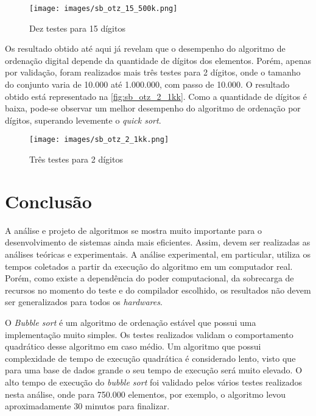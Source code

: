 \documentclass[12pt]{article}
\begin{document}
\begin{figure}[h]
	\centering
	\caption{Dez testes para 15 dígitos}
	\texttt{[image: images/sb\_otz\_15\_500k.png]}
	\label{fig:sb_otz_15_500k}
\end{figure}

Os resultado obtido até aqui já revelam que o desempenho do algoritmo de ordenação digital depende da quantidade de dígitos dos elementos. Porém, apenas por validação, foram realizados mais três testes para 2 dígitos, onde o tamanho do conjunto varia de 10.000 até 1.000.000, com passo de 10.000. O resultado obtido está representado na \autoref{fig:sb_otz_2_1kk}. Como a quantidade de dígitos é baixa, pode-se observar um melhor desempenho do algoritmo de ordenação por dígitos, superando levemente o \textit{quick sort}. 

\begin{figure}[h!]
	\centering
	\caption{Três testes para 2 dígitos}
	\texttt{[image: images/sb\_otz\_2\_1kk.png]}
	\label{fig:sb_otz_2_1kk}
\end{figure}

\section{Conclusão}

A análise e projeto de algoritmos se mostra muito importante para o desenvolvimento de sistemas ainda mais eficientes. Assim, devem ser realizadas as análises teóricas e experimentais. A análise experimental, em particular, utiliza os tempos coletados a partir da execução do algoritmo em um computador real. Porém, como existe a dependência do poder computacional, da sobrecarga de recursos no momento do teste e do compilador escolhido, os resultados não devem ser generalizados para todos os \textit{hardwares}.

O \textit{Bubble sort} é um algoritmo de ordenação estável que possui uma implementação muito simples. Os testes realizados validam o comportamento quadrático desse algoritmo em caso médio. Um algoritmo que possui complexidade de tempo de execução quadrática é considerado lento, visto que para uma base de dados grande o seu tempo de execução será muito elevado. O alto tempo de execução do \textit{bubble sort} foi validado pelos vários testes realizados nesta análise, onde para 750.000 elementos, por exemplo, o algoritmo levou aproximadamente 30 minutos para finalizar.
\end{document}
